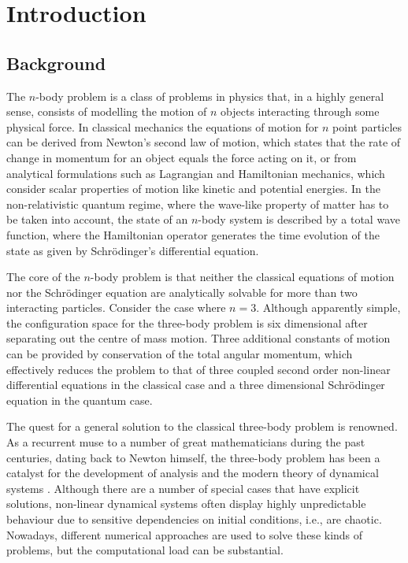 \chapter{Introduction}



\section{Background}
The $n$-body problem is a class of problems in physics that, in a highly general sense, consists of modelling the motion of $n$ objects interacting through some physical force. In classical mechanics the equations of motion for $n$ point particles can be derived from Newton's second law of motion, which states that the rate of change in momentum for an object equals the force acting on it, or from analytical formulations such as Lagrangian and Hamiltonian mechanics, which consider scalar properties of motion like kinetic and potential energies. In the non-relativistic quantum regime, where the wave-like property of matter has to be taken into account, the state of an $n$-body system is described by a total wave function, where the Hamiltonian operator generates the time evolution of the state as given by Schr{\"o}dinger's differential equation.

The core of the $n$-body problem is that neither the classical equations of motion nor the Schr{\"o}dinger equation are analytically solvable for more than two interacting particles. Consider the case where $n=3$. Although apparently simple, the configuration space for the three-body problem is six dimensional after separating out the centre of mass motion. Three additional constants of motion can be provided by conservation of the total angular momentum, which effectively reduces the problem to that of three coupled second order non-linear differential equations in the classical case and a three dimensional Schr{\"o}dinger equation in the quantum case. 

The quest for a general solution to the classical three-body problem is renowned. As a recurrent muse to a number of great mathematicians during the past centuries, dating back to Newton himself, the three-body problem has been a catalyst for the development of analysis and the modern theory of dynamical systems \cite{Chenciner2015}. Although there are a number of special cases that have explicit solutions, non-linear dynamical systems often display highly unpredictable behaviour due to sensitive dependencies on initial conditions, i.e., are chaotic. Nowadays, different numerical approaches are used to solve these kinds of problems, but the computational load can be substantial. 

